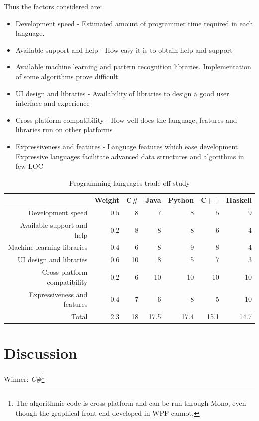 Thus the factors considered are:
\begin{itemize}
\item Development speed - Estimated amount of programmer time required in each language.
\item Available support and help - How easy it is to obtain help and support
\item Available machine learning and pattern recognition libraries. Implementation of some algorithms prove difficult.
\item \ac{UI} design and libraries - Availability of libraries to design a good user interface and experience
\item Cross platform compatibility - How well does the language, features and libraries run on other platforms
\item Expressiveness and features - Language features which ease development. Expressive languages facilitate advanced data structures and algorithms in few \ac{LOC}
\end{itemize}

\begin{table}[htbp]
  \centering
  \caption{Programming languages trade-off study}
    \begin{tabular}{rr|rrrrr}
    \toprule
          & Weight & C\#   & Java  & Python & C++   & Haskell \\
    \midrule
    Development speed & 0.5   & 8     & 7     & 8     & 5     & 9 \\
    Available support and help & 0.2   & 8     & 8     & 8     & 6     & 4 \\
    Machine learning libraries & 0.4   & 6     & 8     & 9     & 8     & 4 \\
    \acs{UI} design and libraries & 0.6   & 10    & 8     & 5     & 7     & 3 \\
    Cross platform compatibility & 0.2   & 6     & 10    & 10    & 10    & 10 \\
    Expressiveness and features & 0.4   & 7     & 6     & 8     & 5     & 10 \\
    \midrule
    Total & 2.3   & 18    & 17.5  & 17.4  & 15.1  & 14.7 \\
    \bottomrule
    \end{tabular}%
  \label{tab:languagetradeoff}%
\end{table}%

\section{Discussion}
Winner: \emph{C\#}\footnote{The algorithmic code is cross platform and can be run through Mono, even though the graphical front end developed in \ac{WPF} cannot.}

